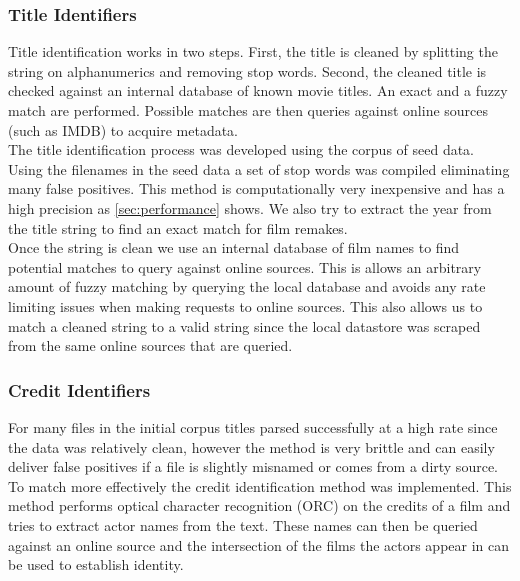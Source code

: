 \documentclass[paper=a4, fontsize=11pt]{scrartcl} %
\numberwithin{equation}{section} %
\numberwithin{figure}{section} %
\numberwithin{table}{section} %
\begin{document}
\subsubsection{Title Identifiers}
\label{sec:title-identifier}

Title identification works in two steps. First, the title is cleaned by splitting the string on alphanumerics and removing stop words. Second, the cleaned title is checked against an internal database of known movie titles. An exact and a fuzzy match are performed. Possible matches are then queries against online sources (such as IMDB) to acquire metadata. \\

The title identification process was developed using the corpus of seed data. Using the filenames in the seed data a set of stop words was compiled eliminating many false positives. This method is computationally very inexpensive and has a high precision as \ref{sec:performance} shows. We also try to extract the year from the title string to find an exact match for film remakes. \\

Once the string is clean we use an internal database of film names to find potential matches to query against online sources. This is allows an arbitrary amount of fuzzy matching by querying the local database and avoids any rate limiting issues when making requests to online sources. This also allows us to match a cleaned string to a valid string since the local datastore was scraped from the same online sources that are queried. \\


\subsubsection{Credit Identifiers}
\label{sec:credit-identifier}

For many files in the initial corpus titles parsed successfully at a high rate since the data was relatively clean, however the method is very brittle and can easily deliver false positives if a file is slightly misnamed or comes from a dirty source. To match more effectively the credit identification method was implemented. This method performs optical character recognition (ORC) on the credits of a film and tries to extract actor names from the text. These names can then be queried against an online source and the intersection of the films the actors appear in can be used to establish identity. \\
\end{document}

